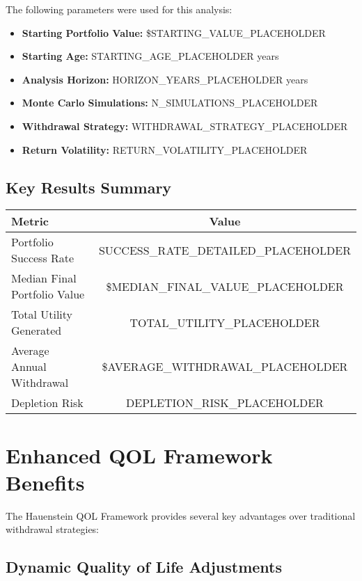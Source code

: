 \documentclass[11pt,a4paper]{article}
\begin{document}
The following parameters were used for this analysis:

\begin{itemize}
\item \textbf{Starting Portfolio Value:} \$STARTING_VALUE_PLACEHOLDER
\item \textbf{Starting Age:} STARTING_AGE_PLACEHOLDER years
\item \textbf{Analysis Horizon:} HORIZON_YEARS_PLACEHOLDER years  
\item \textbf{Monte Carlo Simulations:} N_SIMULATIONS_PLACEHOLDER
\item \textbf{Withdrawal Strategy:} WITHDRAWAL_STRATEGY_PLACEHOLDER
\item \textbf{Return Volatility:} RETURN_VOLATILITY_PLACEHOLDER
\end{itemize}

\subsection{Key Results Summary}

\begin{center}
\begin{tabular}{|l|c|}
\hline
\textbf{Metric} & \textbf{Value} \\
\hline
Portfolio Success Rate & SUCCESS_RATE_DETAILED_PLACEHOLDER \\
\hline
Median Final Portfolio Value & \$MEDIAN_FINAL_VALUE_PLACEHOLDER \\
\hline
Total Utility Generated & TOTAL_UTILITY_PLACEHOLDER \\
\hline
Average Annual Withdrawal & \$AVERAGE_WITHDRAWAL_PLACEHOLDER \\
\hline
Depletion Risk & DEPLETION_RISK_PLACEHOLDER \\
\hline
\end{tabular}
\end{center}

\section{Enhanced QOL Framework Benefits}

The Hauenstein QOL Framework provides several key advantages over traditional withdrawal strategies:

\subsection{Dynamic Quality of Life Adjustments}
\end{document}
